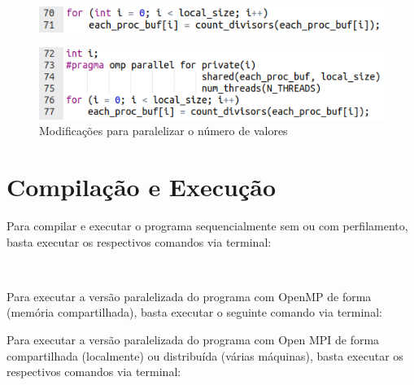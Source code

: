\documentclass[a4paper, 12pt]{article}
\begin{document}
\begin{figure}[H]
    \centering
    \includegraphics[width=.8\textwidth]{Images/p_before.png}
\end{figure}
\vspace*{-0.5cm}
\begin{figure}[H]
    \centering
    \includegraphics[width=.79\textwidth]{Images/p_after.png}
    \caption{Modificações para paralelizar o número de valores}
    \label{fig:map3}
\end{figure}

\section{Compilação e Execução}

\noindent Para compilar e executar o programa sequencialmente sem ou com perfilamento, basta executar os respectivos comandos via terminal:

\begin{center}
    \\
    \vspace{0.5cm}
\end{center}

\vspace{0.2cm}
\noindent Para executar a versão paralelizada do programa com OpenMP de forma (memória compartilhada), basta executar o seguinte comando via terminal:

\begin{center}
\end{center}

\vspace{0.2cm}
\noindent Para executar a versão paralelizada do programa com Open MPI de forma compartilhada (localmente) ou distribuída (várias máquinas), basta executar os respectivos comandos via terminal:

\begin{center}
    \\
    \vspace{0.5cm}
\end{center}
\end{document}
